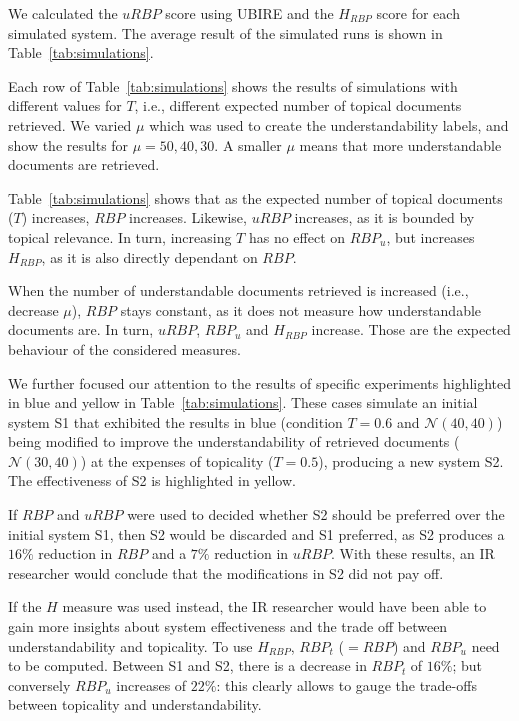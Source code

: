 We calculated the $uRBP$ score using UBIRE and the $H_{RBP}$ score for each simulated system.
The average result of the simulated runs is shown in Table~\ref{tab:simulations}.

Each row of Table~\ref{tab:simulations} shows the results of simulations with different values for $T$, i.e., different expected number of topical documents retrieved.
We varied $\mu$ which was used to create the understandability labels, and show the results for $\mu = 50, 40, 30$.
A smaller $\mu$ means that more understandable documents are retrieved.

Table~\ref{tab:simulations} shows that as the expected number of topical documents ($T$) increases, $RBP$ increases.
Likewise, $uRBP$ increases, as it is bounded by topical relevance.
In turn, increasing $T$ has no effect on $RBP_u$, but increases $H_{RBP}$, as it is also directly dependant on $RBP$.

When the number of understandable documents retrieved is increased (i.e., decrease $\mu$), $RBP$ stays constant, as it does not measure how understandable documents are.
In turn, $uRBP$, $RBP_u$ and $H_{RBP}$ increase. 
Those are the expected behaviour of the considered measures. %

We further focused our attention to the results of specific experiments highlighted in blue and yellow in Table~\ref{tab:simulations}. These cases simulate an initial system S1 that exhibited the results in blue (condition $T=0.6$ and $\mathcal{N}(40,40)$) being modified to improve the understandability of retrieved documents ($\mathcal{N}(30,40)$) at the expenses of topicality ($T=0.5$), producing a new system S2. The effectiveness of S2 is highlighted in yellow. 

If $RBP$ and $uRBP$ were used to decided whether S2 should be preferred over the initial system S1, then S2 would be discarded and S1 preferred, as S2 produces a $16\%$ reduction in $RBP$ and a $7\%$ reduction in $uRBP$. With these results, an IR researcher would conclude that the modifications in S2 did not pay off.

If the $H$ measure was used instead, the IR researcher would have been able to gain more insights about system effectiveness and the trade off between understandability and topicality. To use $H_{RBP}$, $RBP_t$ ($=RBP$) and $RBP_u$ need to be computed. Between S1 and S2, there is a decrease in $RBP_t$ of $16\%$; but conversely $RBP_u$ increases of $22\%$: this clearly allows to gauge the trade-offs between topicality and understandability. 

